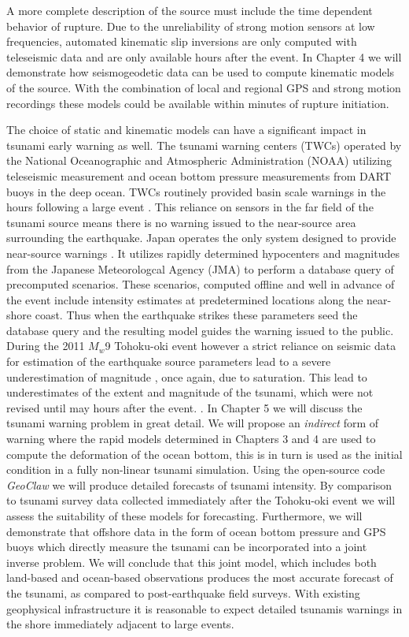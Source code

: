 A more complete description of the source must include the time dependent behavior of rupture. Due to the unreliability of strong motion sensors at low frequencies, automated kinematic slip inversions are only computed with teleseismic data \citep{ji2002} and are only available hours after the event. In Chapter 4 we will demonstrate how seismogeodetic data can be used to compute kinematic models of the source. With the combination of local and regional GPS and strong motion recordings these models could be available within minutes of rupture initiation.

The choice of static and kinematic models can have a significant impact in tsunami early warning as well. The tsunami warning centers (TWCs) operated by the National Oceanographic and Atmospheric Administration (NOAA) utilizing teleseismic measurement and ocean bottom pressure measurements from DART buoys in the deep ocean. TWCs routinely provided basin scale warnings in the hours following a large event \citep{gonzalez2005,titov2005,mungov2013}. This reliance on sensors in the far field of the tsunami source means there is no warning issued to the near-source area surrounding the earthquake. Japan operates the only system designed to provide near-source warnings \citep{tatehata1997,ozaki2011}. It utilizes rapidly determined hypocenters and magnitudes from the Japanese Meteorologcal Agency (JMA) to perform a database query of precomputed scenarios. These scenarios, computed offline and well in advance of the event include intensity estimates at predetermined locations along the near-shore coast. Thus when the earthquake strikes these parameters seed the database query and the resulting model guides the warning issued to the public. During the 2011 $M_w$9 Tohoku-oki event however a strict reliance on seismic data for estimation of the earthquake source parameters lead to a severe underestimation of magnitude \citep{hoshiba2011}, once again, due to saturation. This lead to underestimates of the extent and magnitude of the tsunami, which were not revised until may hours after the event. \citep{ozaki2011}. In Chapter 5 we will discuss the tsunami warning problem in great detail. We will propose an \textit{indirect} form of warning where the rapid models determined in Chapters 3 and 4 are used to compute the deformation of the ocean bottom, this is in turn is used as the initial condition in a  fully non-linear tsunami simulation. Using the open-source code \textit{GeoClaw} \citep{leveque2011} we will produce detailed forecasts of tsunami intensity. By comparison to tsunami survey data collected immediately after the Tohoku-oki event \citep{mori2011,mori2012} we will assess the suitability of these models for forecasting. Furthermore, we will demonstrate that offshore data in the form of ocean bottom pressure and GPS buoys which directly measure the tsunami can be incorporated into a joint inverse problem. We will conclude that this joint model, which includes both land-based and ocean-based observations produces the most accurate forecast of the tsunami, as compared to post-earthquake field surveys. With existing geophysical infrastructure it is reasonable to expect detailed tsunamis warnings in the shore immediately adjacent to large events.



